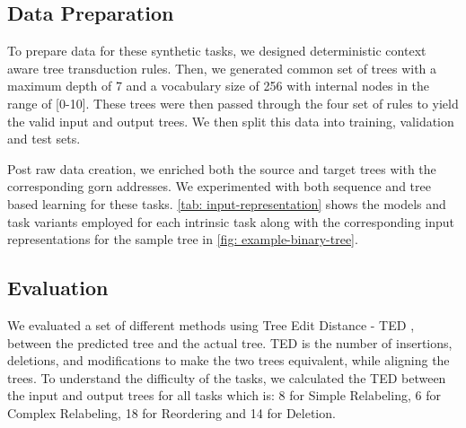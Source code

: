 \documentclass{article}
\begin{document}
\subsection{Data Preparation}
To prepare data for these synthetic tasks, we designed deterministic context aware tree transduction rules. Then, we generated common set of trees with a maximum depth of 7 and a vocabulary size of 256 with internal nodes in the range of [0-10]. These trees were then passed through the four set of rules to yield the valid input and output trees. We then split this data into training, validation and test sets. \par
Post raw data creation, we enriched both the source and target trees with the corresponding gorn addresses. We experimented with both sequence and tree based learning for these tasks. \autoref{tab: input-representation} shows the models and task variants employed for each intrinsic task along with the corresponding input representations for the sample tree in \autoref{fig: example-binary-tree}.


\subsection{Evaluation}
We evaluated a set of different methods using Tree Edit Distance - TED \citep{bille2005survey}, between the predicted tree and the actual tree. TED is the number of insertions, deletions, and modifications to make the two trees equivalent, while aligning the trees. To understand the difficulty of the tasks, we calculated the TED between the input and output trees for all tasks which is: 8 for Simple Relabeling, 6 for Complex Relabeling, 18 for Reordering and 14 for Deletion.
\end{document}
